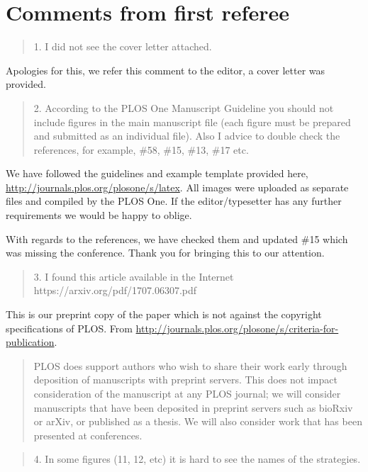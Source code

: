\documentclass[a4]{article}
\begin{document}
\section{Comments from first referee}

\begin{quote}
    1. I did not see the cover letter attached.
\end{quote}

Apologies for this, we refer this comment to the editor, a cover letter was
provided.

\begin{quote}
    2. According to the PLOS One Manuscript Guideline you should not include
    figures in the main manuscript file (each figure must be prepared and
    submitted as an individual file). Also I advice to double check the
    references, for example, \#58, \#15, \#13, \#17 etc.
\end{quote}

We have followed the guidelines and example template provided here,
\url{http://journals.plos.org/plosone/s/latex}. All images were uploaded as
separate files and compiled by the PLOS One. If the editor/typesetter has any
further requirements we would be happy to oblige.

With regards to the references, we have checked them and updated \#15 which was
missing the conference. Thank you for bringing this to our attention.

\begin{quote}
    3. I found this article available in the Internet
    https://arxiv.org/pdf/1707.06307.pdf
\end{quote}

This is our preprint copy of the paper which is not against the copyright
specifications of PLOS. From
\url{http://journals.plos.org/plosone/s/criteria-for-publication}.

\begin{quote}
    PLOS does support authors who wish to share their
    work early through deposition of manuscripts with preprint servers. This
    does not impact consideration of the manuscript at any PLOS journal; we will
    consider manuscripts that have been deposited in preprint servers such as
    bioRxiv or arXiv, or published as a thesis. We will also consider work that
    has been presented at conferences.
\end{quote}

\begin{quote}
    4. In some figures (11, 12, etc) it is hard to see the names of the
    strategies.
\end{quote}
\end{document}
